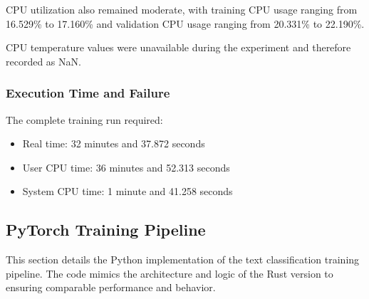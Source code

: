 \documentclass{ieeeaccess}
\begin{document}
CPU utilization also remained moderate, with training CPU usage ranging from 16.529\% to 17.160\% and validation CPU usage ranging from 20.331\% to 22.190\%.

CPU temperature values were unavailable during the experiment and therefore recorded as NaN.

\subsubsection{Execution Time and Failure}

The complete training run required:

\begin{itemize}
    \item Real time: 32 minutes and 37.872 seconds
    \item User CPU time: 36 minutes and 52.313 seconds
    \item System CPU time: 1 minute and 41.258 seconds
\end{itemize}

\subsection{PyTorch Training Pipeline}
This section details the Python implementation of the text classification training pipeline. The code mimics the architecture and logic of the Rust version to ensuring comparable performance and behavior.
\end{document}
